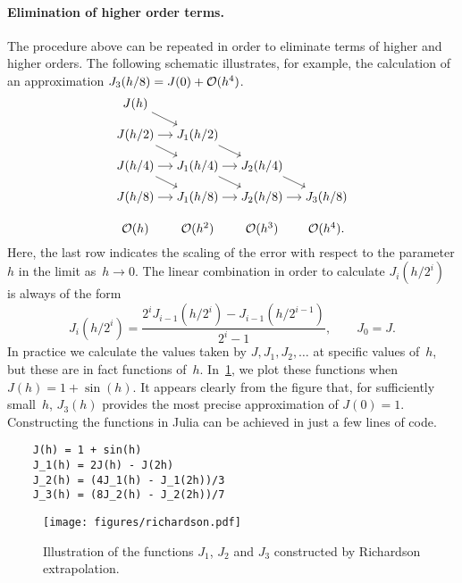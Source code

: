 \paragraph{Elimination of higher order terms.}
The procedure above can be repeated in order to eliminate terms of higher and higher orders.
The following schematic illustrates,
for example, the calculation of an approximation $J_3(h/8) = J(0) + \mathcal O(h^4)$.
\[
    \begin{tikzcd}[cramped, sep=small]
        J(h) \arrow[dr]  \\
        J(h/2) \arrow[r] \arrow[dr] & J_1(h/2) \arrow[dr]  \\
        J(h/4) \arrow[r] \arrow[dr] & J_1(h/4) \arrow[r] \arrow[dr] & J_2(h/4) \arrow[dr]  \\
        J(h/8) \arrow[r] & J_1(h/8) \arrow[r] & J_2(h/8) \arrow[r] & J_3(h/8) \\
        \bigo(h) & \bigo(h^2) & \bigo(h^3) & \bigo(h^4).
    \end{tikzcd}
\]
Here, the last row indicates the scaling of the error with respect to the parameter $h$ in the limit as~$h \to 0$.
The linear combination in order to calculate $J_{i} (h/2^i)$ is always of the form
\[
    J_i(h/2^i) = \frac{2^i J_{i-1} (h/2^i) - J_{i-1}(h/2^{i-1})}{2^i - 1}, \qquad J_0 = J.
\]
In practice we calculate the values taken by $J, J_1, J_2, \dotsc$ at specific values of~$h$,
but these are in fact functions of~$h$.
In~\cref{fig:richardson},
we plot these functions when~$J(h) = 1 + \sin(h)$.
It appears clearly from the figure that,
for sufficiently small~$h$,
$J_3(h)$ provides the most precise approximation of $J(0) = 1$.
Constructing the functions in Julia can be achieved in just a few lines of code.
\begin{verbatim}
    J(h) = 1 + sin(h)
    J_1(h) = 2J(h) - J(2h)
    J_2(h) = (4J_1(h) - J_1(2h))/3
    J_3(h) = (8J_2(h) - J_2(2h))/7
\end{verbatim}
\begin{figure}[ht]
    \centering
    \texttt{[image: figures/richardson.pdf]}
    \caption{Illustration of the functions $J_1$, $J_2$ and $J_3$ constructed by Richardson extrapolation.}%
    \label{fig:richardson}
\end{figure}

